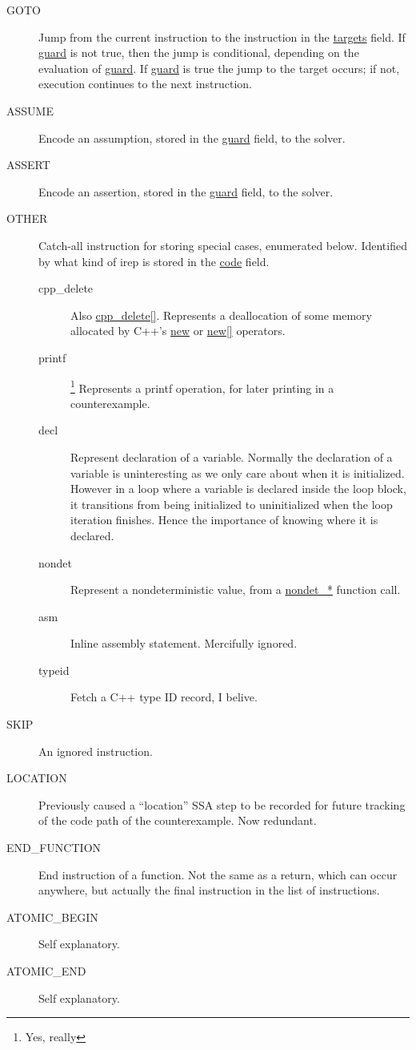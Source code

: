 \documentclass{article}
\begin{document}
\begin{description}
\item[GOTO] Jump from the current instruction to the instruction in the
\url{targets} field. If \url{guard} is not true, then the jump is
conditional, depending on the evaluation of \url{guard}. If \url{guard}
is true the jump to the target occurs; if not, execution continues to the next
instruction.
\item[ASSUME] Encode an assumption, stored in the \url{guard} field, to the
solver.
\item[ASSERT] Encode an assertion, stored in the \url{guard} field, to the
solver.
\item[OTHER] Catch-all instruction for storing special cases, enumerated below.
Identified by what kind of irep is stored in the \url{code} field.
\begin{description}
\item[cpp\_delete] Also \url{cpp_delete[]}. Represents a deallocation of
some memory allocated by C++'s \url{new} or \url{new[]} operators.
\item[printf]\footnote{Yes, really} Represents a printf operation, for later
printing in a counterexample.
\item[decl] Represent declaration of a variable. Normally the declaration of
a variable is uninteresting as we only care about when it is initialized.
However in a loop where a variable is declared inside the loop block, it
transitions from being initialized to uninitialized when the loop iteration
finishes. Hence the importance of knowing where it is declared.
\item[nondet] Represent a nondeterministic value, from a \url{nondet_*}
function call.
\item[asm] Inline assembly statement. Mercifully ignored.
\item[typeid] Fetch a C++ type ID record, I belive.
\end{description}
\item[SKIP] An ignored instruction.
\item[LOCATION] Previously caused a ``location'' SSA step to be recorded for
future tracking of the code path of the counterexample. Now redundant.
\item[END\_FUNCTION] End instruction of a function. Not the same as a return,
which can occur anywhere, but actually the final instruction in the list of
instructions.
\item[ATOMIC\_BEGIN] Self explanatory.
\item[ATOMIC\_END] Self explanatory.

\end{description}
\end{document}
